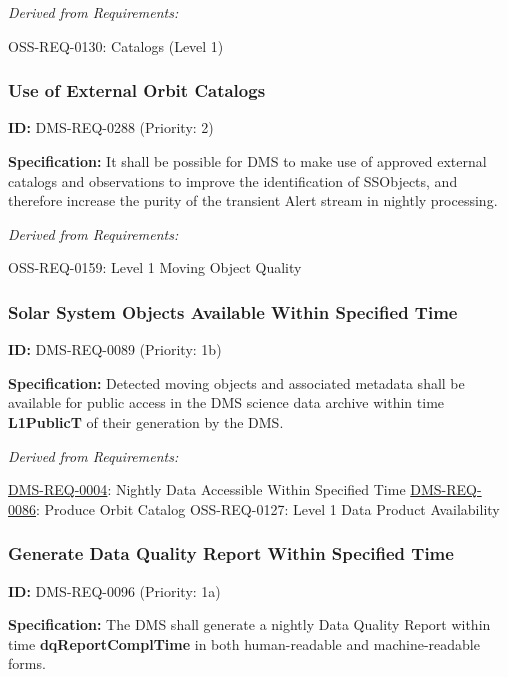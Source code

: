 \documentclass[SE,toc,lsstdraft]{lsstdoc}
\begin{document}
\emph{Derived from Requirements:}

OSS-REQ-0130:
Catalogs (Level 1) \newline

\subsubsection{Use of External Orbit Catalogs}

\label{DMS-REQ-0288}
\textbf{ID:} DMS-REQ-0288 (Priority: 2)

\textbf{Specification:} It shall be possible for DMS to make use of approved external catalogs and observations to improve the identification of SSObjects, and therefore increase the purity of the transient Alert stream in nightly processing.

\emph{Derived from Requirements:}

OSS-REQ-0159:
Level 1 Moving Object Quality \newline

\subsubsection{Solar System Objects Available Within Specified Time}

\label{DMS-REQ-0089}
\textbf{ID:} DMS-REQ-0089 (Priority: 1b)

\textbf{Specification:} Detected moving objects and associated metadata shall be available for public access in the DMS science data archive within time \textbf{L1PublicT }of their generation by the DMS.

\emph{Derived from Requirements:}

\hyperref[DMS-REQ-0004]{DMS-REQ-0004}:
Nightly Data Accessible Within Specified Time \newline
\hyperref[DMS-REQ-0086]{DMS-REQ-0086}:
Produce Orbit Catalog \newline
OSS-REQ-0127:
Level 1 Data Product Availability \newline

\subsubsection{Generate Data Quality Report Within Specified Time}

\label{DMS-REQ-0096}
\textbf{ID:} DMS-REQ-0096 (Priority: 1a)

\textbf{Specification:} The DMS shall generate a nightly Data Quality Report within time \textbf{dqReportComplTime }in both human-readable and machine-readable forms.
\end{document}
